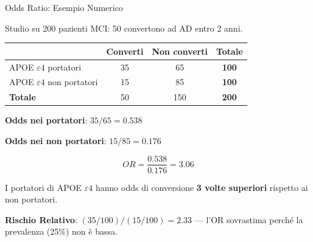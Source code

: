 \documentclass[
  ignorenonframetext,
]{beamer}
\begin{document}
\begin{frame}{Odds Ratio: Esempio Numerico}
\label{odds-ratio-esempio-numerico}
\small

Studio su 200 pazienti MCI: 50 convertono ad AD entro 2 anni.

\vspace{0.4em}

\begin{center}
\begin{tabular}{lcc>{\bfseries}c}
\toprule
 & \textbf{Converti} & \textbf{Non converti} & \textbf{Totale} \\
\midrule
APOE $\varepsilon4$ portatori     & 35 & 65 & 100 \\
APOE $\varepsilon4$ non portatori & 15 & 85 & 100 \\
\midrule
\textbf{Totale}                   & 50 & 150 & 200 \\
\bottomrule
\end{tabular}
\end{center}
\vspace{0.4em}

\textbf{Odds nei portatori}: \(35/65 = 0.538\)

\textbf{Odds nei non portatori}: \(15/85 = 0.176\)

\[OR = \frac{0.538}{0.176} = \mathbf{3.06}\]

\small I portatori di APOE \(\varepsilon4\) hanno odds di conversione
\textbf{3 volte superiori} rispetto ai non portatori.

\textbf{Rischio Relativo}: \((35/100) / (15/100) = 2.33\) --- l'OR
sovrastima perché la prevalenza (25\%) non è bassa.
\end{frame}
\end{document}
